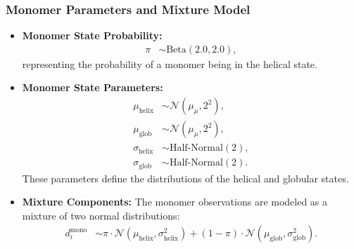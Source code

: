 \documentclass[12pt]{article}
\begin{document}
\subsubsection{Monomer Parameters and Mixture Model}
\begin{itemize}
    \item \textbf{Monomer State Probability:}
    \begin{align}
        \pi &\sim \text{Beta}(2.0, 2.0),
    \end{align}
    representing the probability of a monomer being in the helical state.
    
    \item \textbf{Monomer State Parameters:}
    \begin{align}
        \mu_{\text{helix}} &\sim \mathcal{N}(\mu_{\mu}, 2^2), \\
        \mu_{\text{glob}} &\sim \mathcal{N}(\mu_{\mu}, 2^2), \\
        \sigma_{\text{helix}} &\sim \text{Half-Normal}(2), \\
        \sigma_{\text{glob}} &\sim \text{Half-Normal}(2).
    \end{align}
    These parameters define the distributions of the helical and globular states.
    
    \item \textbf{Mixture Components:}
    The monomer observations are modeled as a mixture of two normal distributions:
    \begin{align}
        d_i^{\text{mono}} &\sim \pi \cdot \mathcal{N}(\mu_{\text{helix}}, \sigma_{\text{helix}}^2) + (1 - \pi) \cdot \mathcal{N}(\mu_{\text{glob}}, \sigma_{\text{glob}}^2).
    \end{align}
\end{itemize}
\end{document}
